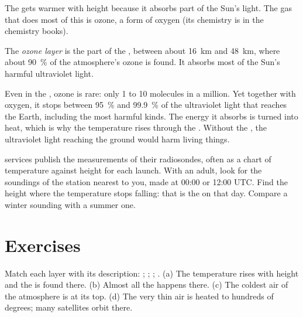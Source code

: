 The  gets warmer with height because it absorbs part of the
Sun's light. The gas that does most of this is ozone, a form of oxygen
(its chemistry is in the chemistry books).

\begin{definition}\label{def:g8:the-atmosphere:ozone-layer}
The \emph{ozone layer} is the part of the
, between about \qty{16}{km} and \qty{48}{km}, where about
90~\% of the atmosphere's ozone is found. It absorbs most of the Sun's
harmful ultraviolet light.
\end{definition}

Even in the , ozone is rare: only 1 to 10 molecules in a
million. Yet together with oxygen, it stops between 95~\% and 99.9~\% of
the ultraviolet light that reaches the Earth, including the most harmful
kinds. The energy it absorbs is turned into heat, which is why the
temperature rises through the . Without the , the
ultraviolet light reaching the ground would harm living things.

\begin{inthefield}
 services publish the measurements of their radiosondes, often
as a chart of temperature against height for each launch. With an adult,
look for the soundings of the station nearest to you, made at 00:00 or
12:00 UTC. Find the height where the temperature stops falling: that is
the  on that day. Compare a winter sounding with a summer one.
\end{inthefield}

\section{Exercises}

\begin{exercise}[$\star$]\label{exo:g8:the-atmosphere:1}
Match each layer with its description: ; ;
; . (a) The temperature rises with height and the
 is found there. (b) Almost all the  happens there.
(c) The coldest air of the atmosphere is at its top. (d) The very thin
air is heated to hundreds of degrees; many satellites orbit there.
\end{exercise}

